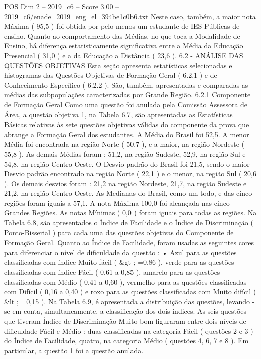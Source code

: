 \begin{textsample}{POS Dim 2 – 2019\_c6 – Score 3.00 – 2019\_c6/enade\_2019\_eng\_el\_394be1c0b6.txt}
Neste caso, também, a maior nota Máxima ( 95,5 ) foi obtida por pelo menos um estudante de IES Públicas de ensino.
Quanto ao comportamento das Médias, no que toca a Modalidade de Ensino, há diferença estatisticamente significativa entre a Média da Educação Presencial ( 31,0 ) e a da Educação a Distância ( 23,6 ). 6.2 - ANÁLISE DAS QUESTÕES OBJETIVAS Esta seção apresenta estatísticas selecionadas e histogramas das Questões Objetivas de Formação Geral ( 6.2.1 ) e de Conhecimento Específico ( 6.2.2 ).
São, também, apresentadas e comparadas as médias das subpopulações caracterizadas por Grande Região. 6.2.1 Componente de Formação Geral Como uma questão foi anulada pela Comissão Assessora de Área, a questão objetiva 1, na Tabela 6.7, são apresentadas as Estatísticas Básicas relativas às sete questões objetivas válidas do componente da prova que abrange a Formação Geral dos estudantes.
A Média do Brasil foi 52,5.
A menor Média foi encontrada na região Norte ( 50,7 ), e a maior, na região Nordeste ( 55,8 ).
As demais Médias foram : 51,2, na região Sudeste, 52,9, na região Sul e 54,8, na região Centro-Oeste.
O Desvio padrão do Brasil foi 21,5, sendo o maior Desvio padrão encontrado na região Norte ( 22,1 ) e o menor, na região Sul ( 20,6 ).
Os demais desvios foram : 21,2 na região Nordeste, 21,7, na região Sudeste e 21,2, na região Centro-Oeste.
As Medianas do Brasil, como um todo, e das cinco regiões foram iguais a 57,1.
A nota Máxima 100,0 foi alcançada nas cinco Grandes Regiões.
As notas Mínimas ( 0,0 ) foram iguais para todas as regiões.
Na Tabela 6.8, são apresentados o Índice de Facilidade e o Índice de Discriminação ( Ponto-Bisserial ) para cada uma das questões objetivas do Componente de Formação Geral.
Quanto ao Índice de Facilidade, foram usadas as seguintes cores para diferenciar o nível de dificuldade da questão : • Azul para as questões classificadas com índice Muito fácil ( \&gt ; =0,86 ), verde para as questões classificadas com índice Fácil ( 0,61 a 0,85 ), amarelo para as questões classificadas com Médio ( 0,41 a 0,60 ), vermelho para as questões classificadas com Difícil ( 0,16 a 0,40 ) e roxo para as questões classificadas com Muito difícil ( \&lt ; =0,15 ).
Na Tabela 6.9, é apresentada a distribuição das questões, levando -se em conta, simultaneamente, a classificação dos dois índices.
As seis questões que tiveram Índice de Discriminação Muito bom figuraram entre dois níveis de dificuldade Fácil e Médio : duas classificadas na categoria Fácil ( questões 2 e 3 ) do Índice de Facilidade, quatro, na categoria Médio ( questões 4, 6, 7 e 8 ).
Em particular, a questão 1 foi a questão anulada.

\end{textsample}
